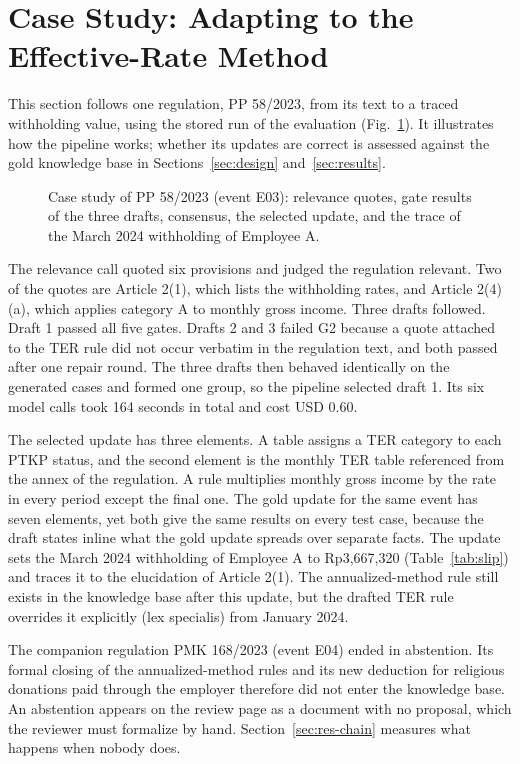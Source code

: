 \section{Case Study: Adapting to the Effective-Rate Method}
\label{sec:casestudy}
This section follows one regulation, PP 58/2023, from its text to a traced withholding value, using the stored run of the evaluation (Fig.~\ref{fig:case}). It illustrates how the pipeline works; whether its updates are correct is assessed against the gold knowledge base in Sections~\ref{sec:design} and~\ref{sec:results}.

\begin{figure}[!t]
\centering
\figCaseStudy
\caption{Case study of PP 58/2023 (event E03): relevance quotes, gate results of the three drafts, consensus, the selected update, and the trace of the March 2024 withholding of Employee A.}
\label{fig:case}
\end{figure}

The relevance call quoted six provisions and judged the regulation relevant. Two of the quotes are Article 2(1), which lists the withholding rates, and Article 2(4)(a), which applies category A to monthly gross income. Three drafts followed. Draft 1 passed all five gates. Drafts 2 and 3 failed G2 because a quote attached to the TER rule did not occur verbatim in the regulation text, and both passed after one repair round. The three drafts then behaved identically on the generated cases and formed one group, so the pipeline selected draft 1. Its six model calls took 164 seconds in total and cost USD 0.60.

The selected update has three elements. A table assigns a TER category to each PTKP status, and the second element is the monthly TER table referenced from the annex of the regulation. A rule multiplies monthly gross income by the rate in every period except the final one. The gold update for the same event has seven elements, yet both give the same results on every test case, because the draft states inline what the gold update spreads over separate facts. The update sets the March 2024 withholding of Employee A to Rp3,667,320 (Table~\ref{tab:slip}) and traces it to the elucidation of Article 2(1). The annualized-method rule still exists in the knowledge base after this update, but the drafted TER rule overrides it explicitly (lex specialis) from January 2024.

The companion regulation PMK 168/2023 (event E04) ended in abstention. Its formal closing of the annualized-method rules and its new deduction for religious donations paid through the employer therefore did not enter the knowledge base. An abstention appears on the review page as a document with no proposal, which the reviewer must formalize by hand. Section~\ref{sec:res-chain} measures what happens when nobody does.
